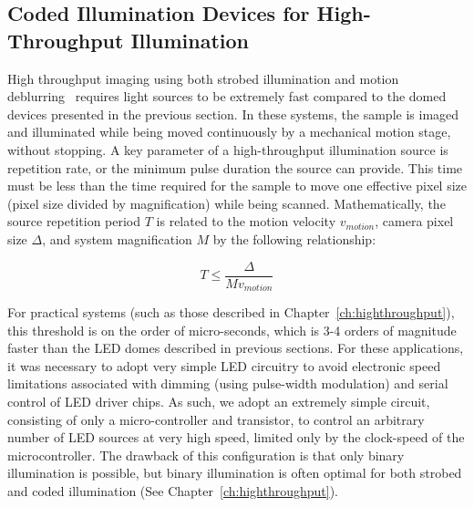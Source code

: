 \subsection{Coded Illumination Devices for High-Throughput Illumination}\label{sec:fabrication:highthroughput}

High throughput imaging using both strobed illumination and motion deblurring~\cite{raskar2006coded} requires light sources to be extremely fast compared to the domed devices presented in the previous section. In these systems, the sample is imaged and illuminated while being moved continuously by a mechanical motion stage, without stopping. A key parameter of a high-throughput illumination source is repetition rate, or the minimum pulse duration the source can provide. This time must be less than the time required for the sample to move one effective pixel size (pixel size divided by magnification) while being scanned. Mathematically, the source repetition period $T$ is related to the motion velocity $v_{motion}$, camera pixel size $\Delta$, and system magnification $M$ by the following relationship:

\begin{equation}
    T \leq \frac{\Delta}{Mv_{motion}}
\end{equation}

For practical systems (such as those described in Chapter~\ref{ch:highthroughput}), this threshold is on the order of micro-seconds, which is 3-4 orders of magnitude faster than the LED domes described in previous sections. For these applications, it was necessary to adopt very simple LED circuitry to avoid electronic speed limitations associated with dimming (using pulse-width modulation) and serial control of LED driver chips. As such, we adopt an extremely simple circuit, consisting of only a micro-controller and transistor, to control an arbitrary number of LED sources at very high speed, limited only by the clock-speed of the microcontroller. The drawback of this configuration is that only binary illumination is possible, but binary illumination is often optimal for both strobed and coded illumination (See Chapter~\ref{ch:highthroughput}).

